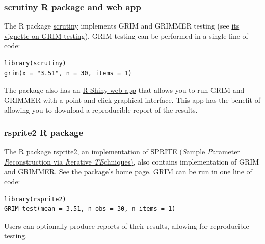 \documentclass[letterpaper, 12pt]{article}
\begin{document}
\subsubsection*{{scrutiny} R package and web app}

The R package \href{https://cran.r-project.org/web/packages/scrutiny/}{scrutiny} implements GRIM and GRIMMER testing (see \href{https://cran.r-project.org/web/packages/scrutiny/vignettes/grim.html}{its vignette on GRIM testing}). GRIM testing can be performed in a single line of code:

\begin{verbatim}
library(scrutiny)
grim(x = "3.51", n = 30, items = 1)
\end{verbatim}

The package also has an \href{https://errors.shinyapps.io/scrutiny}{R Shiny web app} that allows you to run GRIM and GRIMMER with a point-and-click graphical interface. This app has the benefit of allowing you to download a reproducible report of the results.

\subsubsection*{rsprite2 R package}

The R package \href{https://cloud.r-project.org/web/packages/rsprite2/index.html}{rsprite2}, an implementation of \href{https://doi.org/10.7287/peerj.preprints.26968v1}{SPRITE (\textit{S}ample \textit{P}arameter \textit{R}econstruction via \textit{I}terative \textit{TE}chniques)}, also contains implementation of GRIM and GRIMMER. See \href{https://lukaswallrich.github.io/rsprite2}{the package's home page}. GRIM can be run in one line of code:
\begin{verbatim}
library(rsprite2)
GRIM_test(mean = 3.51, n_obs = 30, n_items = 1)
\end{verbatim}
Users can optionally produce reports of their results, allowing for reproducible testing.
\end{document}
